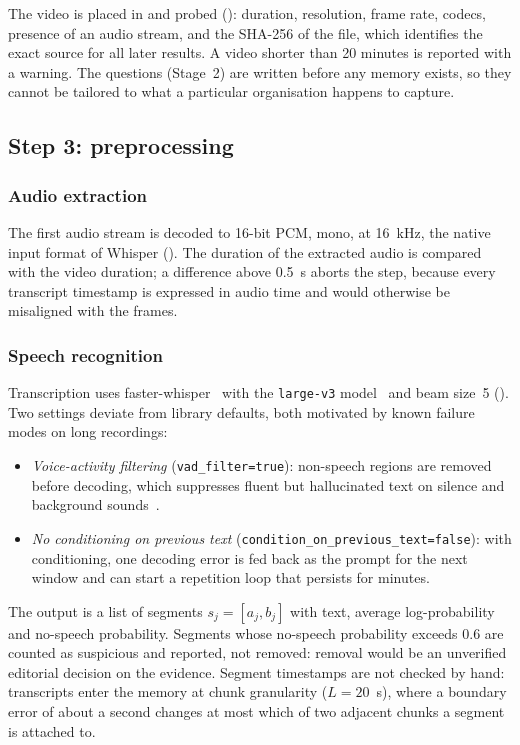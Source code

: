 The video is placed in  and probed
(): duration, resolution, frame rate, codecs, presence of an
audio stream, and the SHA-256 of the file, which identifies the exact source
for all later results. A video shorter than 20 minutes is reported with a
warning. The questions (Stage~2) are written before any memory exists, so they
cannot be tailored to what a particular organisation happens to capture.

\subsection{Step 3: preprocessing}\label{sec:preprocessing}

\subsubsection{Audio extraction}
The first audio stream is decoded to 16-bit PCM, mono, at 16~kHz, the native
input format of Whisper (). The duration of the
extracted audio is compared with the video duration; a difference above
0.5~s aborts the step, because every transcript timestamp is expressed in
audio time and would otherwise be misaligned with the frames.

\subsubsection{Speech recognition}\label{sec:asr}
Transcription uses faster-whisper~\citep{fasterwhisper} with the
\texttt{large-v3} model~\citep{radford2023whisper} and beam size~5
(). Two settings deviate from library defaults, both
motivated by known failure modes on long recordings:
\begin{itemize}[nosep]
  \item \emph{Voice-activity filtering} (\texttt{vad\_filter=true}): non-speech
        regions are removed before decoding, which suppresses fluent but
        hallucinated text on silence and background
        sounds~\citep{koenecke2024careless}.
  \item \emph{No conditioning on previous text}
        (\texttt{condition\_on\_previous\_text=false}): with conditioning, one
        decoding error is fed back as the prompt for the next window and can
        start a repetition loop that persists for minutes.
\end{itemize}
The output is a list of segments $s_j=[a_j,b_j]$ with text, average
log-probability and no-speech probability. Segments whose no-speech
probability exceeds 0.6 are counted as suspicious and reported, not removed:
removal would be an unverified editorial decision on the evidence. Segment
timestamps are not checked by hand: transcripts enter the memory at chunk
granularity ($L=20$~s), where a boundary error of about a second changes at
most which of two adjacent chunks a segment is attached to.

